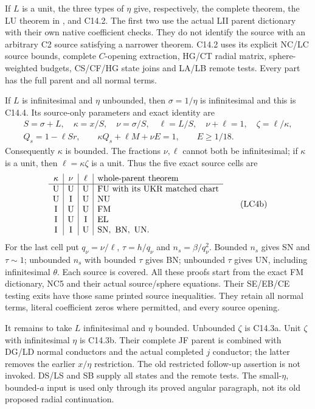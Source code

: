 If \(L\) is a unit, the three types of \(\eta\) give,
respectively, the complete 
theorem, the LU theorem in ,
and C14.2.  The first two use the actual LII parent
dictionary with their own native coefficient checks.
They do not identify the source with an arbitrary C2
source satisfying a narrower theorem.
C14.2 uses its explicit NC/LC source bounds,
complete \(C\)-opening extraction, HG/CT radial matrix,
sphere-weighted budgets, CS/CF/HG state joins and LA/LB
remote tests.  Every part has the full parent and all
normal terms.

If \(L\) is infinitesimal and \(\eta\) unbounded, then
\(\sigma=1/\eta\) is infinitesimal and this is C14.4.
Its source-only parameters and exact identity are
\[
\begin{gathered}
 S=\sigma+L,\quad \kappa=x/S,\quad
 \nu=\sigma/S,\quad \ell=L/S,\quad \nu+\ell=1,\quad
 \zeta=\ell/\kappa,\\
 Q_s=1-\ell Sr,\qquad
 \kappa Q_s+\ell M+\nu E=1,\qquad E\geq1/18.
\end{gathered}\tag{LC4a}
\]
Consequently \(\kappa\) is bounded.  The fractions
\(\nu,\ell\) cannot both be infinitesimal; if \(\kappa\)
is a unit, then \(\ell=\kappa\zeta\) is a unit.
Thus the five exact source cells are
\[
\begin{array}{c|c|c|l}
\kappa&\nu&\ell&\text{whole-parent theorem}\\ \hline
{\rm U}&{\rm U}&{\rm U}&{\rm FU}\text{ with its UKR matched chart}\\
{\rm U}&{\rm I}&{\rm U}&{\rm NU}\\
{\rm I}&{\rm U}&{\rm U}&{\rm FM}\\
{\rm I}&{\rm U}&{\rm I}&{\rm EL}\\
{\rm I}&{\rm I}&{\rm U}&{\rm SN,\ BN,\ UN}.
\end{array}\tag{LC4b}
\]
For the last cell put \(q_\nu=\nu/\ell\),
\(\tau=h/q_\nu\) and \(n_s=\beta/q_\nu^2\).
Bounded \(n_s\) gives SN and \(\tau\sim1\);
unbounded \(n_s\) with bounded \(\tau\) gives BN;
unbounded \(\tau\) gives UN, including infinitesimal
\(\theta\).  Each source is covered.
All these proofs start from the exact FM dictionary,
NC5 and their actual source/sphere equations.
Their SE/EB/CE testing exits have those same printed
source inequalities.  They retain all normal terms,
literal coefficient zeros where permitted, and every
source opening.

It remains to take \(L\) infinitesimal and \(\eta\)
bounded.  Unbounded \(\zeta\) is C14.3a.
Unit \(\zeta\) with infinitesimal \(\eta\) is C14.3b.
Their complete JF parent is combined with DG/LD normal
conductors and the actual completed \(j\) conductor;
the latter removes the earlier \(x/\eta\) restriction.
The old restricted follow-up assertion is not invoked.
DS/LS and SB supply all states and the remote tests.
The small-\(\eta\), bounded-\(a\) input is used only
through its proved angular paragraph, not its old
proposed radial continuation.

